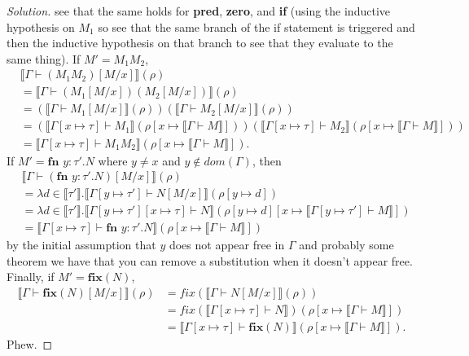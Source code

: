 \documentclass{article}
\newcommand{\den}[1]{\llbracket #1 \rrbracket}
\begin{document}
\begin{proof}[Solution]
    see that the same holds for \textbf{pred}, \textbf{zero}, and \textbf{if}
    (using the inductive hypothesis on $M_1$ so see that the same branch of the
    if statement is triggered and then the inductive hypothesis on that branch
    to see that they evaluate to the same thing). If $M'=M_1 M_2$,
    \begin{align*}
        &\den{\Gamma\vdash (M_1 M_2)[M/x]}(\rho) \\
        &= \den{\Gamma\vdash (M_1[M/x])(M_2[M/x])}(\rho) \\
        &= (\den{\Gamma\vdash M_1[M/x]}(\rho))(\den{\Gamma\vdash M_2[M/x]}(\rho)) \\
        &= (\den{\Gamma[x\mapsto\tau] \vdash M_1}(\rho[x\mapsto\den{\Gamma\vdash M}]))
        (\den{\Gamma[x\mapsto\tau] \vdash M_2}(\rho[x\mapsto\den{\Gamma\vdash M}])) \\
        &= \den{\Gamma[x\mapsto\tau] \vdash M_1 M_2}(\rho[x\mapsto\den{\Gamma\vdash M}]).
    \end{align*}
    If $M'=\textbf{fn }y:\tau'.N$ where $y\neq x$ and $y\notin dom(\Gamma)$, then
    \begin{align*}
        &\den{\Gamma\vdash(\textbf{fn }y:\tau'.N)[M/x]}(\rho) \\
        &= \lambda d\in\den{\tau'}.\den{\Gamma[y\mapsto\tau']\vdash
        N[M/x]}(\rho[y\mapsto d]) \\
        &= \lambda d\in\den{\tau'}.\den{\Gamma[y\mapsto\tau'][x\mapsto\tau]
        \vdash N}(\rho[y\mapsto d][x\mapsto \den{\Gamma[y\mapsto\tau']\vdash
        M}]) \\
        &= \den{\Gamma[x\mapsto\tau]\vdash \textbf{fn }y:\tau'.N}
        (\rho[x\mapsto\den{\Gamma\vdash M}])
    \end{align*}
    by the initial assumption that $y$ does not appear free in $\Gamma$ and
    probably some theorem we have that you can remove a substitution when it
    doesn't appear free. Finally, if $M'=\textbf{fix}(N)$,
    \begin{align*}
        \den{\Gamma\vdash \textbf{fix}(N)[M/x]}(\rho) &=
        \textit{fix}(\den{\Gamma\vdash N[M/x]}(\rho)) \\
        &= \textit{fix}(\den{\Gamma[x\mapsto\tau]\vdash N})(\rho[x\mapsto
        \den{\Gamma\vdash M}]) \\
        &= \den{\Gamma[x\mapsto\tau]\vdash \textbf{fix}(N)}(\rho[x\mapsto
        \den{\Gamma\vdash M}]).
    \end{align*}
    Phew.
\end{proof}
\end{document}
